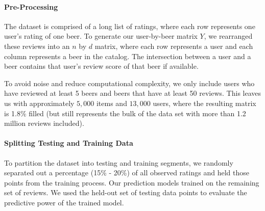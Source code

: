 \documentclass[12pt]{article}
\begin{document}

\paragraph{Pre-Processing}
The dataset is comprised of a long list of ratings, where each row represents one user's rating of one beer. To generate our user-by-beer matrix $Y$, we rearranged these reviews into an $n$ by $d$ matrix, where each row represents a user and each column represents a beer in the catalog. The intersection between a user and a beer contains that user's review score of that beer if available.

To avoid noise and reduce computational complexity, we only include users who have reviewed at least 5 beers and beers that have at least 50 reviews. This leaves us with approximately $5,000$ items and $13,000$ users, where the resulting matrix is 1.8\% filled (but still represents the bulk of the data set with more than 1.2 million reviews included).





\paragraph{Splitting Testing and Training Data} To partition the dataset into testing and training segments, we randomly separated out a percentage (15\% - 20\%) of all observed ratings and held those points from the training process. Our prediction models trained on the remaining set of reviews. We used the held-out set of testing data points to evaluate the predictive power of the trained model.
\end{document}
